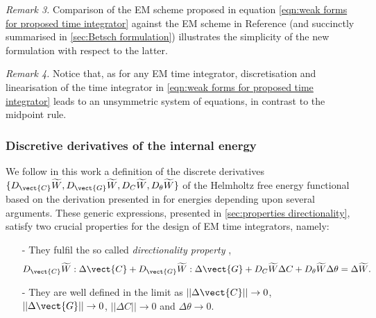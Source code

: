 {{\noindent\makebox[\linewidth]{\rule{\textwidth}{0.4pt}}

\noindent\makebox[\linewidth]{\rule{\textwidth}{0.4pt}}

\noindent \textit{Remark 3.} Comparison of the EM scheme proposed in equation \eqref{eqn:weak forms for proposed time integrator} against the EM scheme in Reference \cite{Betsch2018Thermo} (and succinctly summarised in \ref{sec:Betsch formulation}) illustrates the simplicity of the new formulation with respect to the latter.

\noindent\makebox[\linewidth]{\rule{\textwidth}{0.4pt}}


\noindent \textit{Remark 4.} {Notice that, as for any EM time integrator, discretisation and linearisation of the time integrator in \eqref{eqn:weak forms for proposed time integrator} leads to an unsymmetric system of equations, in contrast to the midpoint rule.}
	
\noindent\makebox[\linewidth]{\rule{\textwidth}{0.4pt}}




\subsubsection{Discretive derivatives of the internal energy}\label{eqn:definition of the discrete derivatives}

We follow in this work a definition of the discrete derivatives $\{D_{\vect{C}}\widetilde{W},D_{\vect{G}}\widetilde{W},D_{C}\widetilde{W},D_{\theta}\widetilde{W}\}$ of the Helmholtz free energy functional based on the derivation presented in \cite{Betsch2018Thermo} for energies depending upon several arguments. 
These generic expressions, presented in \ref{sec:properties directionality},  satisfy two crucial properties for the design of EM time integrators, namely:

\begin{itemize}
	\item [-] They fulfil the so called \textit{directionality property} \cite{Betsch2018Thermo,Gonzalez_EM_2000}, 
%
\begin{equation}\label{eqn:directionality property}
D_{\vect{C}}\widetilde{W}:\Delta\vect{C} + 
D_{\vect{G}}\widetilde{W}:\Delta\vect{G} + 
D_{C}\widetilde{W}\Delta C  + D_{\theta}\widetilde{W}\Delta\theta =\Delta \widetilde{W}.
%
\end{equation}
	\item [-] They are well defined in the limit as $\vert\vert\Delta\vect{C}\vert\vert\rightarrow {0}$, 
	$\vert\vert\Delta\vect{G}\vert\vert\rightarrow {0}$, 
	$\vert\vert\Delta{C}\vert\vert\rightarrow {0}$ and $\Delta\theta\rightarrow 0$.
		

\end{itemize}}}
